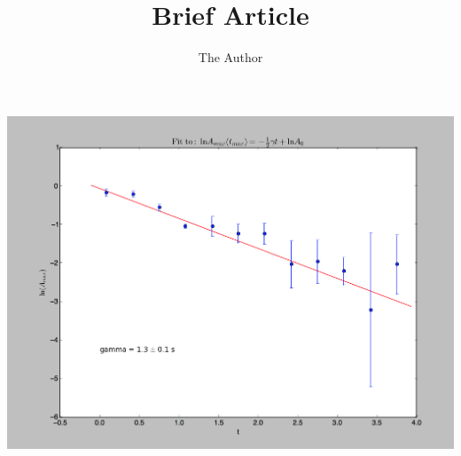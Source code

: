 \documentclass[9pt, oneside]{article}   	%
\title{Brief Article}
\author{The Author}
\begin{document}


\centering
\includegraphics[width=.8\textwidth]{img.png}
\end{document}
